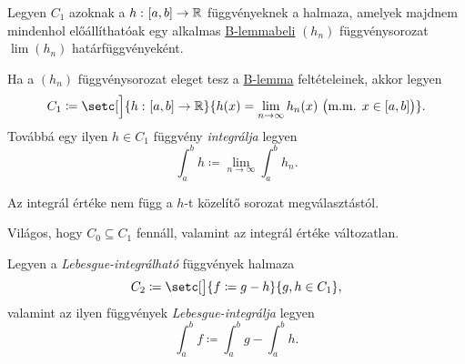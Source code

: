 \documentclass[
]{elteikthesis}[2024/04/26]
\begin{document}
	\newpage\noindent
	Legyen \( C_1 \) azoknak a \( h \,\colon [a, b] \to \mathbb{R} \) függvényeknek a halmaza, 
	amelyek majdnem mindenhol előállíthatóak egy alkalmas
	\hyperref[lem:riesz-b]{B-lemmabeli} \( (h_n) \) függvénysorozat \( \lim(h_n) \) határfüggvényeként.
	
	\begin{definition}{}{}
		Ha a \( (h_n) \) függvénysorozat eleget tesz a \hyperref[lem:riesz-b]{B-lemma} feltételeinek, akkor legyen
		\[
			C_1 \coloneq
			\setc[\Big]{ \func{h}{[a, b]}{\R} }
	    			   { h(x) = \lim_{n \to \infty} h_n(x) \ 
	    			   	 \bigl(\text{m.m. } x \in [a,b] \bigr) }.
		\]
		Továbbá egy ilyen \( h \in C_1 \) függvény \emph{integrálja} legyen
		\[
			\int_a^b h \coloneq \lim_{n \to \infty} \int_a^b h_n.
		\]
	\end{definition}
	\begin{notes}
		\item
		Az integrál értéke nem függ a \( h \)-t közelítő sorozat megválasztástól.
		
		\item 
		Világos, hogy \( C_0 \subseteq C_1 \) fennáll, 
		valamint az integrál értéke változatlan.
	\end{notes}
	
%	
	
	\begin{definition}{}{}
		Legyen a \emph{Lebesgue-integrálható} függvények halmaza
		\[
			C_2 \coloneq
			\setc[\big]{ f \coloneq g - h }{ g, h \in C_1 },
		\]
		valamint az ilyen függvények \emph{Lebesgue-integrálja} legyen
		\[
			\int_a^b f \coloneq \int_a^b g - \int_a^b h.
		\]
	\end{definition}
	
\end{document}
